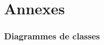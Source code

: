 \part{Annexes} %
\label{prt:annexes}
	

	\section{Diagrammes de classes} %
					
			\label{chap:diag_class}
			
	
			
			
			
	
		

